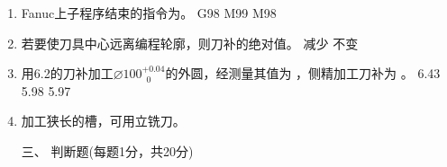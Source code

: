 \documentclass[12pt,twocolumn,landscape,UTF8,twoside]{ctexart}
\begin{document}
\begin{spacing}{1.3}
\begin{enumerate} [1、]
\item Fanuc上子程序结束的指令为。
	{G98}	{M99}	{M98}
\item 若要使刀具中心远离编程轮廓，则刀补的绝对值。
	{减少}	{不变}	
\item 用6.2的刀补加工$\diameter 100^{+0.04}_{~\; 0}$的外圆，经测量其值为 ，侧精加工刀补为	。
	{6.43}	{5.98}	{5.97}
\item 加工狭长的槽，可用立铣刀。

\vspace{1cm}			
\item[\heiti 三、] { \heiti 判断题(每题1分，共20分)}
		

\end{enumerate}
\end{spacing}
\end{document}
